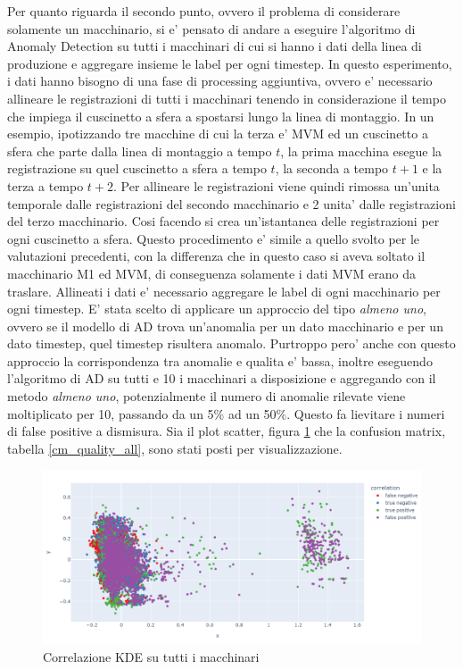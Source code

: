 Per quanto riguarda il secondo punto, ovvero il problema di considerare solamente un macchinario, si e' pensato di andare a eseguire l'algoritmo di Anomaly Detection su tutti i macchinari di cui si hanno i dati della linea di produzione e aggregare insieme le label per ogni timestep.
In questo esperimento, i dati hanno bisogno di una fase di processing aggiuntiva, ovvero e' necessario allineare le registrazioni di tutti i macchinari tenendo in considerazione il tempo che impiega il cuscinetto a sfera a spostarsi lungo la linea di montaggio. In un esempio, ipotizzando tre macchine di cui la terza e' MVM ed un cuscinetto a sfera che parte dalla linea di montaggio a tempo $t$, la prima macchina esegue la registrazione su quel cuscinetto a sfera a tempo $t$, la seconda a tempo $t+1$ e la terza a tempo $t+2$. Per allineare le registrazioni viene quindi rimossa un'unita temporale dalle registrazioni del secondo macchinario e 2 unita' dalle registrazioni del terzo macchinario. Cosi facendo si crea un'istantanea delle registrazioni per ogni cuscinetto a sfera. Questo procedimento e' simile a quello svolto per le valutazioni precedenti, con la differenza che in questo caso si aveva soltato il macchinario M1 ed MVM, di conseguenza solamente i dati MVM erano da traslare.
Allineati i dati e' necessario aggregare le label di ogni macchinario per ogni timestep. E' stata scelto di applicare un approccio del tipo \textit{almeno uno}, ovvero se il modello di AD trova un'anomalia per un dato macchinario e per un dato timestep, quel timestep risultera anomalo. 
Purtroppo pero' anche con questo approccio la corrispondenza tra anomalie e qualita e' bassa, inoltre eseguendo l'algoritmo di AD su tutti e 10 i macchinari a disposizione e aggregando con il metodo \textit{almeno uno}, potenzialmente il numero di anomalie rilevate viene moltiplicato per 10, passando da un 5\% ad un 50\%. Questo fa lievitare i numeri di false positive a dismisura. Sia il plot scatter, figura \ref{quality_all_machines} che la confusion matrix, tabella \ref{cm_quality_all}, sono stati posti per visualizzazione.

\begin{figure}[t]
	\centering
	\includegraphics[width=14cm, scale=1]{images/correlation_all_quality_plot.png}
 \caption{Correlazione KDE su tutti i macchinari}
	\label{quality_all_machines}
\end{figure}

